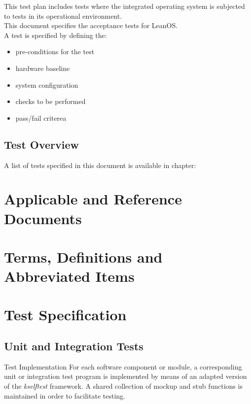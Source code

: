 \noindent
This test plan includes tests where the integrated operating
system is subjected to tests in its operational environment.\\

\noindent
This document specifies the acceptance tests for LeanOS.\\

\noindent
A test is specified by defining the:
\begin{itemize}
	\item pre-conditions for the test
	\item hardware baseline
	\item system configuration
	\item checks to be performed
	\item pass/fail criterea
\end{itemize}



\section{Test Overview}

A list of tests specified in this document is available in chapter:


\chapter{Applicable and Reference Documents} %

\printbibliography[heading=none]


\chapter{Terms, Definitions and Abbreviated Items}

\printglossary[type=acronym]
\printglossary[type=main, style=altlist]


\chapter{Test Specification}

\section{Unit and Integration Tests}

{Test Implementation}{%
For each software component or module, a corresponding unit or integration test
program is implemented by means of an adapted version of the \emph{kselftest}
framework. A shared collection of mockup and stub functions is maintained in
order to facilitate testing.
}%
{}{}

